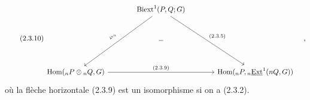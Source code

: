\begin{equation}\tag{2.3.10}
\begin{tikzcd}[column sep=large, row sep=large]
 & \mathrm{Biext}^1(P,Q;G) \arrow[ddl, "\varphi^n"'] \arrow[ddr, "(2.3.5)"] & \\
 & - & \\
\mathrm{Hom}({}_nP\otimes{}_nQ,G) \arrow[rr, "(2.3.9)"] & & \mathrm{Hom}({}_nP,{}_n\underline{\mathrm{Ext}}^1(nQ,G))
\end{tikzcd}\quad ,
\end{equation}
où la flèche horizontale (2.3.9) est un isomorphisme si on a (2.3.2).

